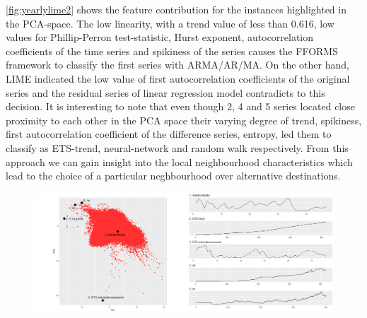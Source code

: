 \documentclass[11pt,a4paper,]{article}
\begin{document}
\autoref{fig:yearlylime2} shows the feature contribution for the
instances highlighted in the PCA-space. The low linearity, with a trend
value of less than 0.616, low values for Phillip-Perron test-statistic,
Hurst exponent, autocorrelation coefficients of the time series and
spikiness of the series causes the FFORMS framework to classify the
first series with ARMA/AR/MA. On the other hand, LIME indicated the low
value of first autocorrelation coefficients of the original series and
the residual series of linear regression model contradicts to this
decision. It is interesting to note that even though 2, 4 and 5 series
located close proximity to each other in the PCA space their varying
degree of trend, spikiness, first autocorrelation coefficient of the
difference series, entropy, led them to classify as ETS-trend,
neural-network and random walk respectively. From this approach we can
gain insight into the local neighbourhood characteristics which lead to
the choice of a particular neghbourhood over alternative destinations.

\clearpage

\begin{figure}[h]

{\centering \includegraphics{figures/yearlylime-1} 

}

\end{figure}
\end{document}
